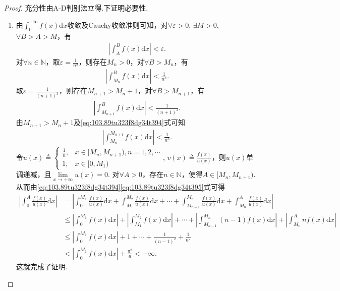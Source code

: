 \documentclass[../../main.tex]{subfiles}%
\begin{document}
\begin{proof}
充分性由A-D判别法立得.下证明必要性.
\begin{enumerate}
\item 由$\int_0^{+\infty} f(x)\mathrm{d}x$收敛及Cauchy收敛准则可知，对$\forall \varepsilon >0$, $\exists M>0$, $\forall B>A>M$，有
\begin{align*}
\left| \int_A^B f(x)\mathrm{d}x \right| < \varepsilon.
\end{align*}
对$\forall n\in \mathbb{N}$，取$\varepsilon = \frac{1}{n^3}$，则存在$M_n>0$，对$\forall B>M_n$，有
\begin{align}
\left| \int_{M_n}^B f(x)\mathrm{d}x \right| < \frac{1}{n^3}. \label{eq:103.89tu323f8dg34t394}
\end{align}
取$\varepsilon = \frac{1}{(n+1)^3}$，则存在$M_{n+1}>M_n+1$，对$\forall B>M_{n+1}$，有
\begin{align*}
\left| \int_{M_{n+1}}^B f(x)\mathrm{d}x \right| < \frac{1}{(n+1)^3}.
\end{align*}
由$M_{n+1}>M_n+1$及\eqref{eq:103.89tu323f8dg34t394}式可知
\begin{align}\label{eq:103.89tu323f8dg34t395}
\left| \int_{M_n}^{M_{n+1}} f(x)\mathrm{d}x \right| < \frac{1}{n^3}.
\end{align}
令$u(x) \triangleq \begin{cases} 
\frac{1}{n}, & x\in [M_n, M_{n+1}),n=1,2,\cdots \\
1, & x\in [0, M_1)
\end{cases}$, $v(x) \triangleq \frac{f(x)}{u(x)}$，则$u(x)$单调递减，且$\lim\limits_{x\rightarrow +\infty} u(x) = 0$.
对$\forall A>0$，存在$n\in \mathbb{N}$，使得$A\in [M_n, M_{n+1})$. 从而由\eqref{eq:103.89tu323f8dg34t394}\eqref{eq:103.89tu323f8dg34t395}式可得
\begin{align*}
\left| \int_0^A \frac{f(x)}{u(x)}\mathrm{d}x \right| &= \left| \int_0^{M_1} \frac{f(x)}{u(x)}\mathrm{d}x + \int_{M_1}^{M_2} \frac{f(x)}{u(x)}\mathrm{d}x + \cdots + \int_{M_{n-1}}^{M_n} \frac{f(x)}{u(x)}\mathrm{d}x + \int_{M_n}^A \frac{f(x)}{u(x)}\mathrm{d}x \right| \\
&\leqslant \left| \int_0^{M_1} f(x)\mathrm{d}x \right| + \left| \int_{M_1}^{M_2} f(x)\mathrm{d}x \right| + \cdots + \left| \int_{M_{n-1}}^{M_n} (n-1)f(x)\mathrm{d}x \right| + \left| \int_{M_n}^A nf(x)\mathrm{d}x \right| \\
&\leqslant \left| \int_0^{M_1} f(x)\mathrm{d}x \right| + 1 + \cdots + \frac{1}{(n-1)^2} + \frac{1}{n^2} \\
&< \left| \int_0^{M_1} f(x)\mathrm{d}x \right| + \frac{\pi^2}{6} < +\infty.
\end{align*}
这就完成了证明.


\end{enumerate}
\end{proof}
\end{document}
